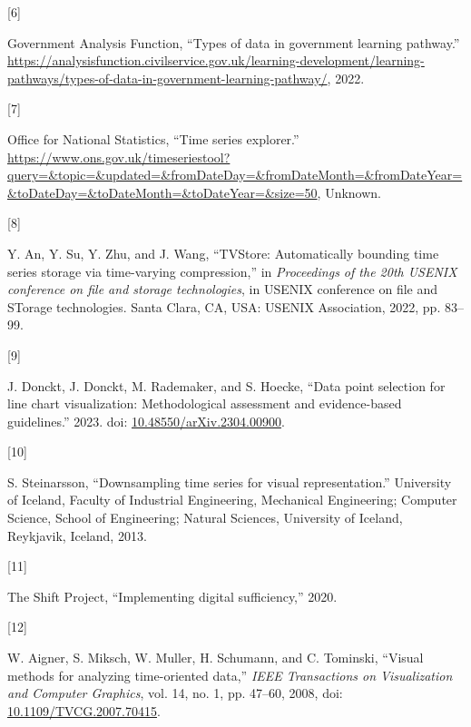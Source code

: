 \documentclass{article}
\newlength{\cslhangindent}
\newlength{\csllabelwidth}
\newlength{\cslentryspacingunit} %
\newenvironment{CSLReferences}[2] %
 {%
  \setlength{\parindent}{0pt}
  \ifodd #1
  \let\oldpar\par
  \def\par{\hangindent=\cslhangindent\oldpar}
  \fi
  \setlength{\parskip}{#2\cslentryspacingunit}
 }%
 {}
\newcommand{\CSLLeftMargin}[1]{\parbox[t]{\csllabelwidth}{#1}}
\newcommand{\CSLRightInline}[1]{\parbox[t]{\linewidth - \csllabelwidth}{#1}\break}
\begin{document}
\begin{CSLReferences}{0}{0}
\leavevmode{}%
\CSLLeftMargin{{[}6{]} }
\CSLRightInline{Government Analysis Function, {``Types of data in
government learning pathway.''}
\url{https://analysisfunction.civilservice.gov.uk/learning-development/learning-pathways/types-of-data-in-government-learning-pathway/},
2022.}

\leavevmode{}%
\CSLLeftMargin{{[}7{]} }
\CSLRightInline{Office for National Statistics, {``Time series
explorer.''}
\url{https://www.ons.gov.uk/timeseriestool?query=\&topic=\&updated=\&fromDateDay=\&fromDateMonth=\&fromDateYear=\&toDateDay=\&toDateMonth=\&toDateYear=\&size=50},
Unknown.}

\leavevmode{}%
\CSLLeftMargin{{[}8{]} }
\CSLRightInline{Y. An, Y. Su, Y. Zhu, and J. Wang, {``TVStore:
Automatically bounding time series storage via time-varying
compression,''} in \emph{Proceedings of the 20th USENIX conference on
file and storage technologies}, in USENIX conference on file and STorage
technologies. Santa Clara, CA, USA: USENIX Association, 2022, pp.
83--99.}

\leavevmode{}%
\CSLLeftMargin{{[}9{]} }
\CSLRightInline{J. Donckt, J. Donckt, M. Rademaker, and S. Hoecke,
{``Data point selection for line chart visualization: Methodological
assessment and evidence-based guidelines.''} 2023. doi:
\href{https://doi.org/10.48550/arXiv.2304.00900}{10.48550/arXiv.2304.00900}.}

\leavevmode{}%
\CSLLeftMargin{{[}10{]} }
\CSLRightInline{S. Steinarsson, {``Downsampling time series for visual
representation.''} University of Iceland, Faculty of Industrial
Engineering, Mechanical Engineering; Computer Science, School of
Engineering; Natural Sciences, University of Iceland, Reykjavik,
Iceland, 2013.}

\leavevmode{}%
\CSLLeftMargin{{[}11{]} }
\CSLRightInline{The Shift Project, {``Implementing digital
sufficiency,''} 2020.}

\leavevmode{}%
\CSLLeftMargin{{[}12{]} }
\CSLRightInline{W. Aigner, S. Miksch, W. Muller, H. Schumann, and C.
Tominski, {``Visual methods for analyzing time-oriented data,''}
\emph{IEEE Transactions on Visualization and Computer Graphics}, vol.
14, no. 1, pp. 47--60, 2008, doi:
\href{https://doi.org/10.1109/TVCG.2007.70415}{10.1109/TVCG.2007.70415}.}


\end{CSLReferences}
\end{document}

